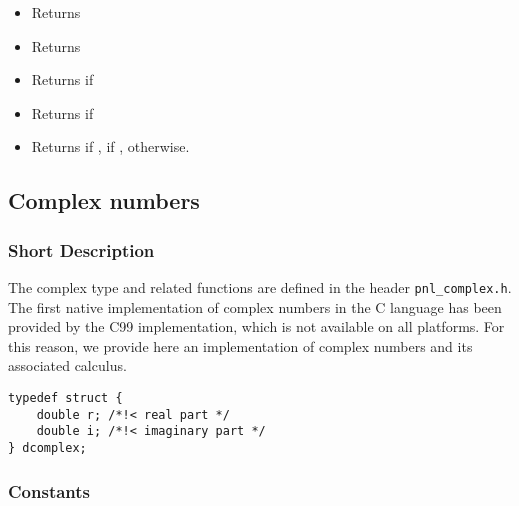 \begin{itemize}
\item {}
  \sshortdescribe Returns  

\item {}
  \sshortdescribe Returns  

\item {}
  \sshortdescribe Returns  if 

\item {}
  \sshortdescribe Returns  if 

\item {}
  \sshortdescribe Returns  if ,  if ,
   otherwise.
\end{itemize}



\subsection{Complex numbers}
\subsubsection{Short Description}

The complex type and related functions are defined in the header
\verb!pnl_complex.h!.\\

The first native implementation of complex numbers in the C language has been
provided by the C99 implementation, which is not available on all
platforms. For this reason, we provide here an implementation of complex
numbers and its associated calculus.

\begin{verbatim}
typedef struct {
    double r; /*!< real part */
    double i; /*!< imaginary part */
} dcomplex;
\end{verbatim}


\subsubsection{Constants}

\begin{describeconst}
\end{describeconst}

